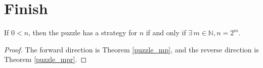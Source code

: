 \section{Finish}

\begin{theorem}
    \label{puzzle}
    \leanok
If $0 < n$, then the puzzle has a strategy for $n$ if and only if  $\exists\,m \in \mathbb{N}, n = 2^m$.
\end{theorem}

\begin{proof}
    \leanok
The forward direction is {\B Theorem} \ref{puzzle_mp}, and the reverse direction is {\B Theorem} \ref{puzzle_mpr}.
\end{proof}
